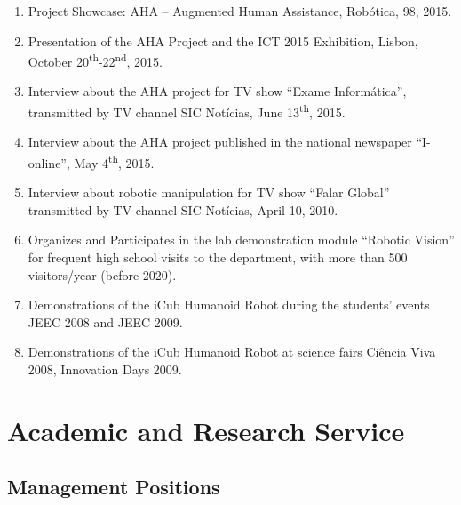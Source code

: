 \documentclass[
]{article}
\begin{document}
\begin{enumerate}
  2016.
\item
  Project Showcase: AHA -- Augmented Human Assistance, Robótica, 98,
  2015.
\item
  Presentation of the AHA Project and the ICT 2015 Exhibition, Lisbon,
  October 20\textsuperscript{th}-22\textsuperscript{nd}, 2015.
\item
  Interview about the AHA project for TV show ``Exame Informática'',
  transmitted by TV channel SIC Notícias, June 13\textsuperscript{th},
  2015.
\item
  Interview about the AHA project published in the national newspaper
  ``I-online'', May 4\textsuperscript{th}, 2015.
\item
  Interview about robotic manipulation for TV show ``Falar Global''
  transmitted by TV channel SIC Notícias, April 10, 2010.
\item
  Organizes and Participates in the lab demonstration module ``Robotic
  Vision'' for frequent high school visits to the department, with more
  than 500 visitors/year (before 2020).
\item
  Demonstrations of the iCub Humanoid Robot during the students' events
  JEEC 2008 and JEEC 2009.
\item
  Demonstrations of the iCub Humanoid Robot at science fairs Ciência
  Viva 2008, Innovation Days 2009.
\end{enumerate}

\section{Academic and Research
Service}\label{academic-and-research-service-1}

\subsection{Management Positions}\label{management-positions}
\end{document}
